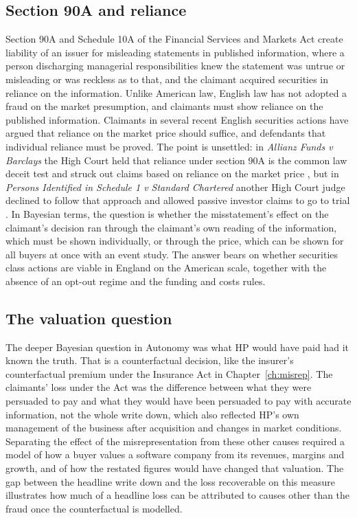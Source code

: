 \subsection{Section 90A and reliance}

Section 90A and Schedule 10A of the Financial Services and Markets Act create liability of an issuer for misleading statements in published information, where a person discharging managerial responsibilities knew the statement was untrue or misleading or was reckless as to that, and the claimant acquired securities in reliance on the information. Unlike American law, English law has not adopted a fraud on the market presumption, and claimants must show reliance on the published information. Claimants in several recent English securities actions have argued that reliance on the market price should suffice, and defendants that individual reliance must be proved. The point is unsettled: in \emph{Allianz Funds v Barclays} the High Court held that reliance under section 90A is the common law deceit test and struck out claims based on reliance on the market price \citep{allianz2024}, but in \emph{Persons Identified in Schedule 1 v Standard Chartered} another High Court judge declined to follow that approach and allowed passive investor claims to go to trial \citep{stanchart2025}. In Bayesian terms, the question is whether the misstatement's effect on the claimant's decision ran through the claimant's own reading of the information, which must be shown individually, or through the price, which can be shown for all buyers at once with an event study. The answer bears on whether securities class actions are viable in England on the American scale, together with the absence of an opt-out regime and the funding and costs rules.

\subsection{The valuation question}

The deeper Bayesian question in Autonomy was what HP would have paid had it known the truth. That is a counterfactual decision, like the insurer's counterfactual premium under the Insurance Act in Chapter~\ref{ch:misrep}. The claimants' loss under the Act was the difference between what they were persuaded to pay and what they would have been persuaded to pay with accurate information, not the whole write down, which also reflected HP's own management of the business after acquisition and changes in market conditions. Separating the effect of the misrepresentation from these other causes required a model of how a buyer values a software company from its revenues, margins and growth, and of how the restated figures would have changed that valuation. The gap between the headline write down and the loss recoverable on this measure illustrates how much of a headline loss can be attributed to causes other than the fraud once the counterfactual is modelled.

